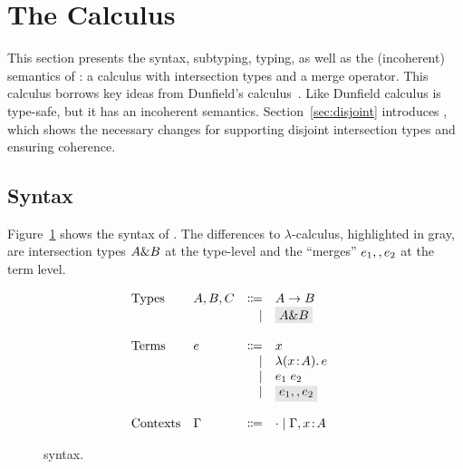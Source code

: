 \section{The \name Calculus}
\label{sec:fi}


This section presents the syntax, subtyping, typing, as well as the
(incoherent) semantics of \name: a calculus with intersection types
and a merge
operator. This calculus borrows key ideas from Dunfield's
calculus~\cite{dunfield2014elaborating}. Like Dunfield calculus
\name is type-safe, but it has an incoherent semantics.
Section~\ref{sec:disjoint} introduces \name, which shows the necessary changes
for supporting disjoint intersection types and
ensuring coherence.

\subsection{Syntax}

Figure~\ref{fig:fi-syntax} shows the syntax of \name. The differences to
$\lambda$-calculus, highlighted in gray, are intersection types $A \& B$ at the
type-level and the ``merges'' $e_1 ,, e_2$ at the term level.

\begin{figure}[t]
  \[
    \begin{array}{l}
      \begin{array}{llrll}
        \text{Types}
        & A, B, C & \Coloneqq & A \to B        & \\
        &      & \mid & \highlight{$A \inter B$}  & \\

        \\
        \text{Terms}
        & e & \Coloneqq & x            & \\
        &   & \mid & \lamty x A e      & \\
        &   & \mid & \app {e_1} {e_2}  & \\
        &   & \mid & \highlight{$e_1 \mergeop e_2$}  & \\

        \\
        \text{Contexts}
        & \Gamma & \Coloneqq & \cdot
                   \mid \Gamma, x \oftype A  & \\
      \end{array}
    \end{array}
  \]

  \caption{\name syntax.}
  \label{fig:fi-syntax}
\end{figure}

